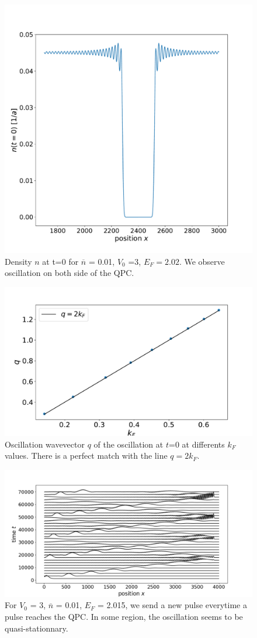 \documentclass[aps,prl,preprint,groupedaddress]{revtex4-1}
\begin{document}
\begin{figure}
	\centering
	\includegraphics[width=0.7\linewidth]{../figures/oscillation_t0/plot_density_t0_Ef202}
	\caption{Density $n$ at t=0 for $\overline{n}$ = 0.01, $V_0$ =3, $E_F = 2.02$. We observe oscillation on both side of the QPC.}
	\label{fig:plotdensityt0ef202}
\end{figure}
\begin{figure}
	\centering
	\includegraphics[width=0.7\linewidth]{../figures/oscillation_t0/q_vs_kf_at_t0}
	\caption{Oscillation wavevector $q$ of the oscillation at $t$=0 at differents $k_F$ values. There is a perfect match with the line $q = 2k_F$.}
	
	

	\label{fig:qvskfatt0}
\end{figure}

\begin{figure}
	\centering
	\includegraphics[width=0.7\linewidth]{../figures/plot_manypulse/plot_manypulse_L5000_V030_Ef2015_u00_n001}
	\caption{For $V_0$ = 3, $\overline{n}$ = 0.01, $E_F$ = 2.015, we send a new pulse everytime a pulse reaches the QPC. In some region, the oscillation seems to be quasi-stationnary.  }	\label{fig:plotmanypulsel5000v03}
\end{figure}
\end{document}
